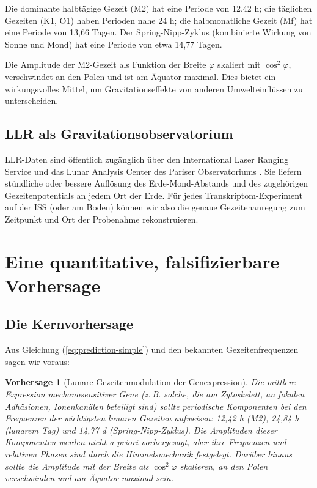 \documentclass[12pt,a4paper]{article}
\newtheorem{prediction}[theorem]{Vorhersage}
\theoremstyle{remark}
\begin{document}
	Die dominante halbtägige Gezeit (M2) hat eine Periode von 12,42 h; die täglichen Gezeiten (K1, O1) haben Perioden nahe 24 h; die halbmonatliche Gezeit (Mf) hat eine Periode von 13,66 Tagen. Der Spring-Nipp-Zyklus (kombinierte Wirkung von Sonne und Mond) hat eine Periode von etwa 14,77 Tagen.
	
	Die Amplitude der M2-Gezeit als Funktion der Breite \(\varphi\) skaliert mit \(\cos^2\varphi\), verschwindet an den Polen und ist am Äquator maximal. Dies bietet ein wirkungsvolles Mittel, um Gravitationseffekte von anderen Umwelteinflüssen zu unterscheiden.
	
	\subsection{LLR als Gravitationsobservatorium}
	
	LLR-Daten sind öffentlich zugänglich über den International Laser Ranging Service \cite{ILRS} und das Lunar Analysis Center des Pariser Observatoriums \cite{LLR-POLAC}. Sie liefern stündliche oder bessere Auflösung des Erde-Mond-Abstands und des zugehörigen Gezeitenpotentials an jedem Ort der Erde. Für jedes Transkriptom-Experiment auf der ISS (oder am Boden) können wir also die genaue Gezeitenanregung zum Zeitpunkt und Ort der Probenahme rekonstruieren.
	
	\section{Eine quantitative, falsifizierbare Vorhersage}
	\label{sec:prediction}
	
	\subsection{Die Kernvorhersage}
	
	Aus Gleichung (\ref{eq:prediction-simple}) und den bekannten Gezeitenfrequenzen sagen wir voraus:
	
	\begin{prediction}[Lunare Gezeitenmodulation der Genexpression]
		Die mittlere Expression mechanosensitiver Gene (z. B. solche, die am Zytoskelett, an fokalen Adhäsionen, Ionenkanälen beteiligt sind) sollte periodische Komponenten bei den Frequenzen der wichtigsten lunaren Gezeiten aufweisen: 12,42 h (M2), 24,84 h (lunarem Tag) und 14,77 d (Spring-Nipp-Zyklus). Die Amplituden dieser Komponenten werden nicht a priori vorhergesagt, aber ihre Frequenzen und relativen Phasen sind durch die Himmelsmechanik festgelegt. Darüber hinaus sollte die Amplitude mit der Breite als \(\cos^2\varphi\) skalieren, an den Polen verschwinden und am Äquator maximal sein.
	\end{prediction}
	
\end{document}
